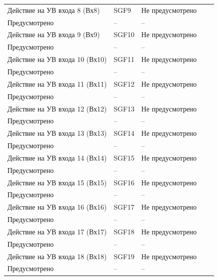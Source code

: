 \begin{longtable}{|>{\centering\arraybackslash}m{5.3cm}|>{\centering\arraybackslash}m{3.3cm}|>{\centering\arraybackslash}m{4.2cm}|>{\centering\arraybackslash}m{1.8cm}|>{\centering\arraybackslash}m{1cm}|}
\hline
\centering Действие на УВ входа 8 (Вх8)  & \centering SGF9 & \centering Не предусмотрено \\ Предусмотрено & \centering -- & \centering \arraybackslash -- \\
\hline
\centering Действие на УВ входа 9 (Вх9)  & \centering SGF10 & \centering Не предусмотрено \\ Предусмотрено & \centering -- & \centering \arraybackslash -- \\
\hline
\centering Действие на УВ входа 10 (Вх10)  & \centering SGF11 & \centering Не предусмотрено \\ Предусмотрено & \centering -- & \centering \arraybackslash -- \\
\hline
\centering Действие на УВ входа 11 (Вх11)  & \centering SGF12 & \centering Не предусмотрено \\ Предусмотрено & \centering -- & \centering \arraybackslash -- \\
\hline
\centering Действие на УВ входа 12 (Вх12)  & \centering SGF13 & \centering Не предусмотрено \\ Предусмотрено & \centering -- & \centering \arraybackslash -- \\
\hline
\centering Действие на УВ входа 13 (Вх13)  & \centering SGF14 & \centering Не предусмотрено \\ Предусмотрено & \centering -- & \centering \arraybackslash -- \\
\hline
\centering Действие на УВ входа 14 (Вх14)  & \centering SGF15 & \centering Не предусмотрено \\ Предусмотрено & \centering -- & \centering \arraybackslash -- \\
\hline
\centering Действие на УВ входа 15 (Вх15)  & \centering SGF16 & \centering Не предусмотрено \\ Предусмотрено & \centering -- & \centering \arraybackslash -- \\
\hline
\centering Действие на УВ входа 16 (Вх16)  & \centering SGF17 & \centering Не предусмотрено \\ Предусмотрено & \centering -- & \centering \arraybackslash -- \\
\hline
\centering Действие на УВ входа 17 (Вх17)  & \centering SGF18 & \centering Не предусмотрено \\ Предусмотрено & \centering -- & \centering \arraybackslash -- \\
\hline
\centering Действие на УВ входа 18 (Вх18)  & \centering SGF19 & \centering Не предусмотрено \\ Предусмотрено & \centering -- & \centering \arraybackslash -- \\

\end{longtable}

